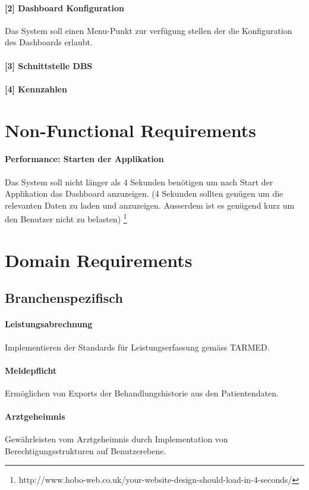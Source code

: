 \documentclass[a4paper]{scrreprt}
\begin{document}
\paragraph{[2] Dashboard Konfiguration}
Das System soll einen Menu-Punkt zur verfügung stellen der die Konfiguration des Dashboards erlaubt. 
\paragraph{[3] Schnittstelle DBS}
\paragraph{[4] Kennzahlen}

\section{Non-Functional Requirements}
\paragraph{Performance: Starten der Applikation}
Das System soll nicht länger als 4 Sekunden benötigen um nach Start der Applikation das Dashboard anzuzeigen. (4 Sekunden sollten genügen um die relevanten Daten zu laden und anzuzeigen. Ausserdem ist es genügend kurz um den Benutzer nicht zu belasten)
\footnote{http://www.hobo-web.co.uk/your-website-design-should-load-in-4-seconds/}



\section{Domain Requirements}
\subsection{Branchenspezifisch}
\paragraph{Leistungsabrechnung} Implementieren der Standards für Leistungserfassung gemäss TARMED.

\paragraph{Meldepflicht} Ermöglichen von Exports der Behandlungshistorie aus den Patientendaten.

\paragraph{Arztgeheimnis} Gewährleisten vom Arztgeheimnis durch Implementation von Berechtigungsstrukturen auf Benutzerebene.
\end{document}
